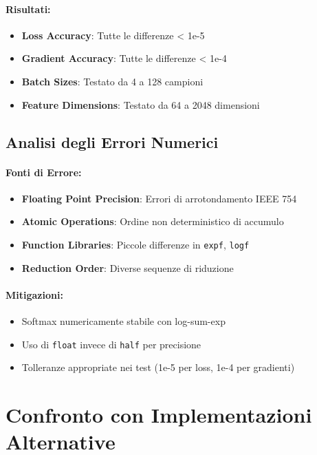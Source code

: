\documentclass[a4paper,11pt]{article}
\begin{document}
\paragraph{Risultati:}
\begin{itemize}
    \item \textbf{Loss Accuracy}: Tutte le differenze < 1e-5
    \item \textbf{Gradient Accuracy}: Tutte le differenze < 1e-4
    \item \textbf{Batch Sizes}: Testato da 4 a 128 campioni
    \item \textbf{Feature Dimensions}: Testato da 64 a 2048 dimensioni
\end{itemize}

\subsection{Analisi degli Errori Numerici}

\paragraph{Fonti di Errore:}
\begin{itemize}
    \item \textbf{Floating Point Precision}: Errori di arrotondamento IEEE 754
    \item \textbf{Atomic Operations}: Ordine non deterministico di accumulo
    \item \textbf{Function Libraries}: Piccole differenze in \texttt{expf}, \texttt{logf}
    \item \textbf{Reduction Order}: Diverse sequenze di riduzione
\end{itemize}

\paragraph{Mitigazioni:}
\begin{itemize}
    \item Softmax numericamente stabile con log-sum-exp
    \item Uso di \texttt{float} invece di \texttt{half} per precisione
    \item Tolleranze appropriate nei test (1e-5 per loss, 1e-4 per gradienti)
\end{itemize}

\section{Confronto con Implementazioni Alternative}
\end{document}
